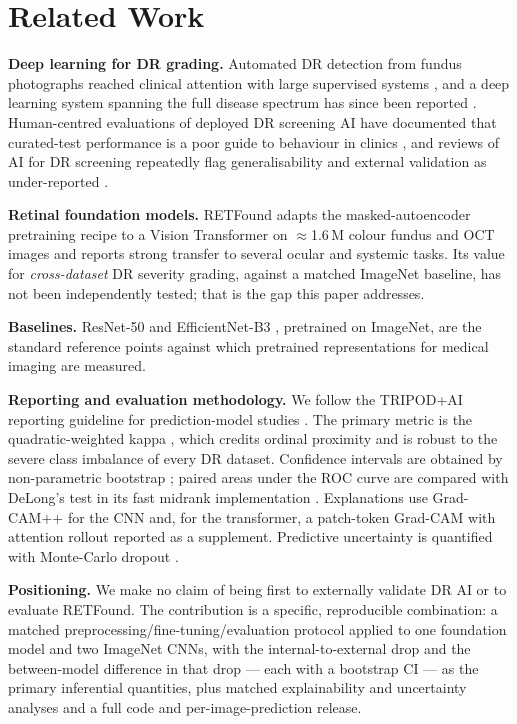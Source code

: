 \documentclass[journal]{IEEEtran}
\begin{document}
\section{Related Work}
\label{sec:related}

\textbf{Deep learning for DR grading.} Automated DR detection from fundus
photographs reached clinical attention with large supervised systems
\cite{gulshan2016,ting2017}, and a deep learning system spanning the full disease
spectrum has since been reported \cite{dai2021spectrum}. Human-centred
evaluations of deployed DR screening AI have documented that curated-test
performance is a poor guide to behaviour in clinics \cite{beede2020}, and reviews
of AI for DR screening repeatedly flag generalisability and external validation
as under-reported \cite{grzybowski2020review}.

\textbf{Retinal foundation models.} RETFound \cite{zhou2023retfound} adapts the
masked-autoencoder pretraining recipe \cite{he2022mae} to a Vision Transformer
\cite{dosovitskiy2021vit} on $\approx$1.6\,M colour fundus and OCT images and
reports strong transfer to several ocular and systemic tasks. Its value for
\emph{cross-dataset} DR severity grading, against a matched ImageNet baseline,
has not been independently tested; that is the gap this paper addresses.

\textbf{Baselines.} ResNet-50 \cite{he2016resnet} and EfficientNet-B3
\cite{tan2019efficientnet}, pretrained on ImageNet, are the standard reference
points against which pretrained representations for medical imaging are measured.

\textbf{Reporting and evaluation methodology.} We follow the TRIPOD+AI reporting
guideline for prediction-model studies \cite{tripodai2024}. The primary metric is
the quadratic-weighted kappa \cite{cohen1968kappa}, which credits ordinal
proximity and is robust to the severe class imbalance of every DR dataset.
Confidence intervals are obtained by non-parametric bootstrap
\cite{efron1994bootstrap}; paired areas under the ROC curve are compared with
DeLong's test \cite{delong1988} in its fast midrank implementation
\cite{sun2014fast}. Explanations use Grad-CAM++ \cite{chattopadhay2018gradcampp}
for the CNN and, for the transformer, a patch-token Grad-CAM with attention
rollout \cite{abnar2020rollout} reported as a supplement. Predictive uncertainty
is quantified with Monte-Carlo dropout \cite{gal2016dropout}.

\textbf{Positioning.} We make no claim of being first to externally validate DR
AI or to evaluate RETFound. The contribution is a specific, reproducible
combination: a matched preprocessing/fine-tuning/evaluation protocol applied to
one foundation model and two ImageNet CNNs, with the internal-to-external drop
and the between-model difference in that drop --- each with a bootstrap CI --- as
the primary inferential quantities, plus matched explainability and uncertainty
analyses and a full code and per-image-prediction release.
\end{document}
